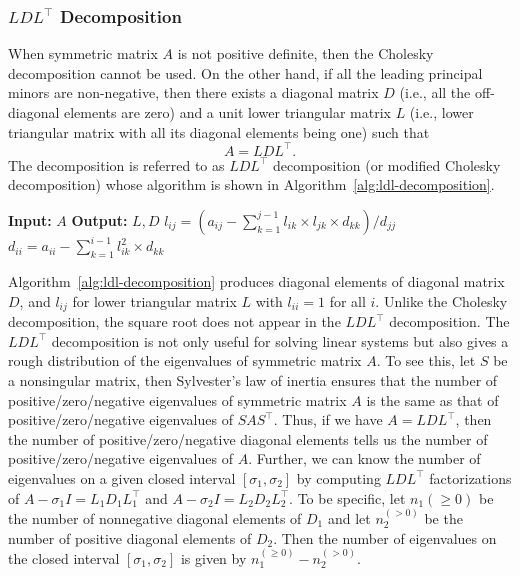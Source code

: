 \subsubsection{{$LDL^\top$ Decomposition}}\label{subsec:ldl-decomposition}
{When symmetric matrix $A$ is not positive definite, then the Cholesky decomposition cannot be used. On the other hand, if all the leading principal minors are non-negative, then there exists a diagonal matrix $D$ (i.e., all the off-diagonal elements are zero) and a unit lower triangular matrix $L$ (i.e., lower triangular matrix with all its diagonal elements being one) such that}
\[A=LDL^\top.\]
{The decomposition is referred to as $LDL^\top$ decomposition (or modified Cholesky decomposition) whose algorithm is shown in Algorithm~\ref{alg:ldl-decomposition}.}
\begin{algorithm}[H]
\caption{{$LDL^\top$ decomposition}}\label{alg:ldl-decomposition}
\begin{algorithmic}[1]
\Statex\textbf{Input:} $A$
\Statex\textbf{Output:} $L,D$
\State $l_{ij}=(a_{ij}-\sum_{k=1}^{j-1}l_{ik}\times l_{jk}\times d_{kk})/d_{jj}$
\EndFor
\State $d_{ii}=a_{ii}-\sum_{k=1}^{i-1}l_{ik}^2\times d_{kk}$
\EndFor
\end{algorithmic}
\end{algorithm}
{Algorithm~\ref{alg:ldl-decomposition} produces diagonal elements of diagonal matrix $D$, and $l_{ij}$ for lower triangular matrix $L$ with $l_{ii}=1$ for all $i$. Unlike the Cholesky decomposition, the square root does not appear in the $LDL^\top$ decomposition.}
{The $LDL^\top$ decomposition is not only useful for solving linear systems but also gives a rough distribution of the eigenvalues of symmetric matrix $A$. To see this, let $S$ be a nonsingular matrix, then Sylvester's law of inertia ensures that the number of positive/zero/negative eigenvalues of symmetric matrix $A$ is the same as that of positive/zero/negative eigenvalues of $SAS^\top$. Thus, if we have $A=LDL^\top$, then the number of positive/zero/negative diagonal elements tells us the number of positive/zero/negative eigenvalues of $A$.}
{Further, we can know the number of eigenvalues on a given closed interval $[\sigma_1,\sigma_2]$ by computing $LDL^\top$ factorizations of $A-\sigma_1 I=L_1D_1L_1^\top$ and $A-\sigma_2 I=L_2D_2L_2^\top$. To be specific, let $n_1(\ge0)$ be the number of nonnegative diagonal elements of $D_1$ and let $n_2^{(>0)}$ be the number of positive diagonal elements of $D_2$. Then the number of eigenvalues on the closed interval $[\sigma_1,\sigma_2]$ is given by $n_1^{(\ge0)}-n_2^{(>0)}$.}
